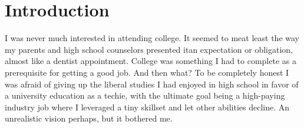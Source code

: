 \documentclass{article}
\begin{document}
\newcommand{\phd}{Ph.D.}
\newcommand{\university}{%
\texttt{<your-college-here>}
}


\newcommand{\sloc}{13.6 million lines}
\newcommand{\numprojects}{43}





\section{Introduction}
I was never much interested in attending college.
It seemed to me\textemdash at least the way my parents and high school counselors presented it\textemdash an expectation or obligation, almost like a dentist appointment. 
College was something I had to complete as a prerequisite for getting a good job.
And then what? 
To be completely honest I was afraid of giving up the liberal studies I had enjoyed in high school in favor of a university education as a techie, with the ultimate goal being a high-paying industry job where I leveraged a tiny skillset and let other abilities decline. 
An unrealistic vision perhaps, but it bothered me. 
\end{document}
